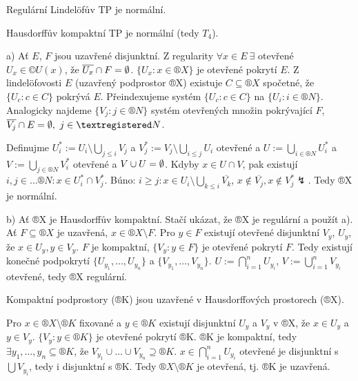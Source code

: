 \documentclass[12pt]{article}					%
\begin{document}
    \begin{veta}
        Regulární Lindelöfův TP je normální.

        Hausdorffův kompaktní TP je normální (tedy $T_4$).

        \begin{dukazin}
                a) Ať $E$, $F$ jsou uzavřené disjunktní. Z regularity $\forall x \in E\ \exists$ otevřené $U_x \in ©U(x)$, že $\overline{U_x} \cap F = \emptyset$. $\{U_x: x\in ®X\}$ je otevřené pokrytí $E$. Z lindelöfovosti $E$ (uzavřený podprostor ®X) existuje $C \subseteq ®X$ spočetné, že $\{U_c: c \in C\}$ pokrývá $E$. Přeindexujeme systém $\{U_c: c \in C\}$ na $\{U_i: i \in ®N\}$. Analogicky najdeme $\{V_j: j \in ®N\}$ systém otevřených množin pokrývající $F$, $\overline{V_j} \cap E = \O,\ j \in ®N$.

                Definujme $U_i^* := U_i \setminus \bigcup_{j ≤ i} V_j$ a $V_j^* := V_j \setminus \bigcup_{i ≤ j} U_i$ otevřené a $U := \bigcup_{i \in ®N} U_i^*$ a $V := \bigcup_{j \in ®N} V_i^*$ otevřené a $V \cup U = \emptyset$. Kdyby $x \in U \cap V$, pak existují $i, j \in …®N: x \in U_i^*\cap V_j^*$. Búno: $i ≥ j: x \in U_i \setminus \bigcup_{k ≤ i} \overline{V_k}$, $x \notin \overline{V_j}, x \notin V_j^* \lightning$. Tedy ®X je normální.

                b) Ať ®X je Hausdorffův kompaktní. Stačí ukázat, že ®X je regulární a použít a). Ať $F \subseteq ®X$ je uzavřená, $x \in ®X \setminus F$. Pro $y \in F$ existují otevřené disjunktní $V_y$, $U_y$, že $x \in U_y, y \in V_y$. $F$ je kompaktní, $\{V_y : y \in F\}$ je otevřené pokrytí $F$. Tedy existují konečné podpokrytí $\{U_{y_1}, …, U_{y_n}\}$ a $\{V_{y_1}, …, V_{y_n}\}$. $U := \bigcap_{i = 1}^n U_{y_i}$, $V := \bigcup_{i = 1}^n V_{y_i}$ otevřené, tedy ®X regulární.
        \end{dukazin}
    \end{veta}


    \begin{tvrzeni}
            Kompaktní podprostory (®K) jsou uzavřené v Hausdorffových prostorech (®X).
        \begin{dukazin}
                Pro $x \in ®X \setminus ®K$ fixované a $y \in ®K$ existují disjunktní $U_y$ a $V_y$ v ®X, že $x \in U_y$ a $y \in V_y$. $\{V_y: y \in ®K\}$ je otevřené pokrytí ®K. ®K je kompaktní, tedy $\exists y_1, …, y_n \subseteq ®K$, že $V_{y_1} \cup … \cup V_{y_n} \supseteq ®K$. $x \in \bigcap_{i=1}^n U_{y_i}$ otevřené je disjunktní s $\bigcup V_{y_i}$, tedy i disjunktní s ®K. Tedy $®X \setminus ®K$ je otevřená, tj. ®K je uzavřená.
        \end{dukazin}
    \end{tvrzeni}
\end{document}
